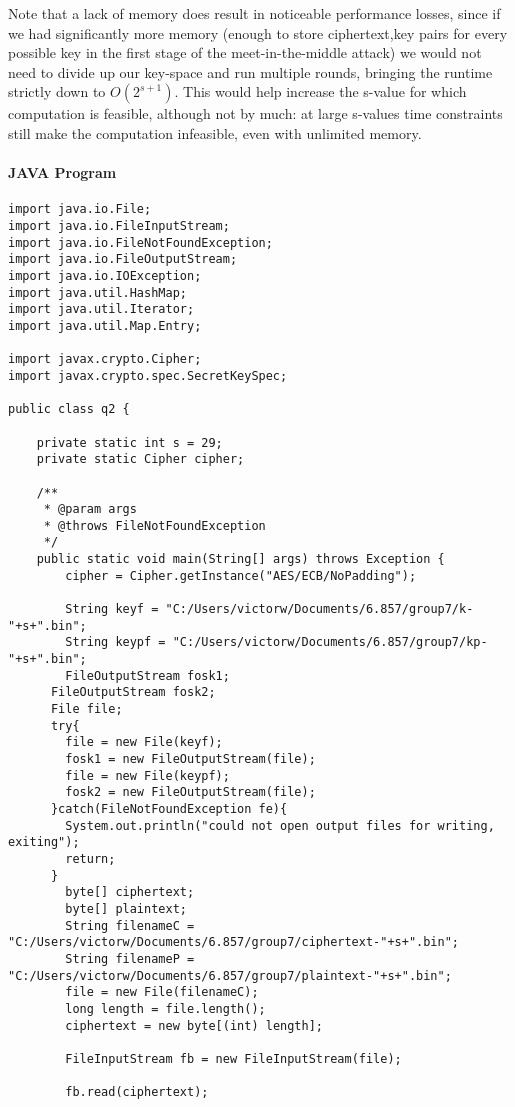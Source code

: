 \documentclass[11pt]{article}
\begin{document}
Note that a lack of memory does result in noticeable performance losses, since if we had significantly more memory (enough to store ciphertext,key pairs for every possible key in the first stage of the meet-in-the-middle attack) we would not need to divide up our key-space and run multiple rounds, bringing the runtime strictly down to $O(2^{s+1})$. This would help increase the s-value for which computation is feasible, although not by much: at large s-values time constraints still make the computation infeasible, even with unlimited memory.

\paragraph{JAVA Program}
\begin{verbatim}
import java.io.File;
import java.io.FileInputStream;
import java.io.FileNotFoundException;
import java.io.FileOutputStream;
import java.io.IOException;
import java.util.HashMap;
import java.util.Iterator;
import java.util.Map.Entry;

import javax.crypto.Cipher;
import javax.crypto.spec.SecretKeySpec;

public class q2 {

	private static int s = 29;
	private static Cipher cipher;

	/**
	 * @param args
	 * @throws FileNotFoundException
	 */
	public static void main(String[] args) throws Exception {
		cipher = Cipher.getInstance("AES/ECB/NoPadding");

		String keyf = "C:/Users/victorw/Documents/6.857/group7/k-"+s+".bin";
		String keypf = "C:/Users/victorw/Documents/6.857/group7/kp-"+s+".bin";
		FileOutputStream fosk1;
	  FileOutputStream fosk2;
	  File file;
	  try{
	    file = new File(keyf);
	    fosk1 = new FileOutputStream(file);                     
	    file = new File(keypf);
	    fosk2 = new FileOutputStream(file);
	  }catch(FileNotFoundException fe){
	    System.out.println("could not open output files for writing, exiting");
	    return;
	  }
		byte[] ciphertext;
		byte[] plaintext;
		String filenameC = "C:/Users/victorw/Documents/6.857/group7/ciphertext-"+s+".bin";
		String filenameP = "C:/Users/victorw/Documents/6.857/group7/plaintext-"+s+".bin";
		file = new File(filenameC);
		long length = file.length();
		ciphertext = new byte[(int) length];

		FileInputStream fb = new FileInputStream(file);

		fb.read(ciphertext);


\end{verbatim}
\end{document}
